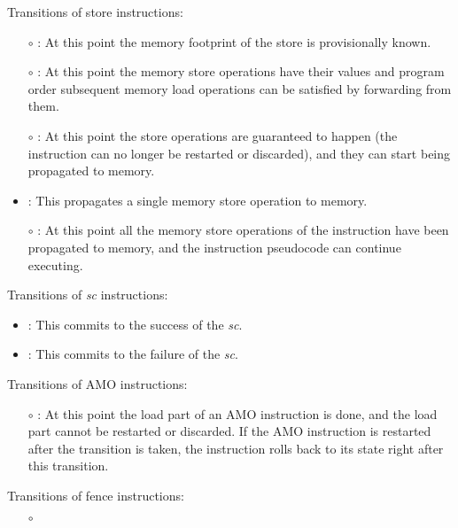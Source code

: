 \noindent Transitions of store instructions:
\begin{itemize}
\item[$\circ$] : At this point the memory footprint of the store is provisionally known.
\item[$\circ$] : At this point the memory store operations have their values and program order subsequent memory load operations can be satisfied by forwarding from them.
\item[$\circ$] : At this point the store operations are guaranteed to happen (the instruction can no longer be restarted or discarded), and they can start being propagated to memory.
\item {}: This propagates a single memory store operation to memory.
\item[$\circ$] : At this point all the memory store operations of the instruction have been propagated to memory, and the instruction pseudocode can continue executing.
\end{itemize}

\noindent Transitions of {\em  sc} instructions:
\begin{itemize}
\item {}: This commits to the success of the {\em sc}.
\item {}: This commits to the failure of the {\em sc}.
\end{itemize}

\noindent Transitions of AMO instructions:
\begin{itemize}
\item[$\circ$] : At this point the load part of an AMO instruction is done, and the load part cannot be restarted or discarded. If the AMO instruction is restarted after the transition is taken, the instruction rolls back to its state right after this transition.
\end{itemize}

\noindent Transitions of fence instructions:
\begin{itemize}
\item[$\circ$] 
\end{itemize}

